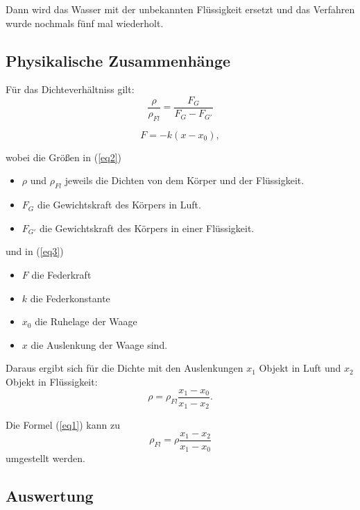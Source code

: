 \documentclass[11pt,a4paper]{article}
\begin{document}
Dann wird das Wasser mit der unbekannten Flüssigkeit ersetzt und das Verfahren wurde nochmals fünf mal wiederholt.

\subsection{Physikalische Zusammenh\"ange}

F\"ur das Dichteverh\"altniss gilt:\\

\begin{equation}
\frac{\rho}{\rho_{Fl}} = \frac{F_G}{F_G - F_{G'}}\label{eq2}
\end{equation}

\begin{equation}
F = -k(x-x_0)\mathrm{,}\label{eq3}
\end{equation}

wobei die Gr\"o\ss en in (\ref{eq2})
\begin{itemize}
  \item $\rho$ und $\rho_{Fl}$ jeweils die Dichten von dem K\"orper und der Fl\"ussigkeit.
  \item $F_G$ die Gewichtskraft des K\"orpers in Luft.
  \item $F_{G'}$ die Gewichtskraft des K\"orpers in einer Fl\"ussigkeit.
\end{itemize}

und in (\ref{eq3})
\begin{itemize}
  \item $F$ die Federkraft
  \item $k$ die Federkonstante
  \item $x_0$ die Ruhelage der Waage
  \item $x$ die Auslenkung der Waage sind.
\end{itemize}

Daraus ergibt sich f\"ur die Dichte mit den Auslenkungen $x_1$ Objekt in Luft und $x_2$ Objekt in Fl\"ussigkeit:
\begin{equation}
\rho=\rho_{Fl}\frac{x_1-x_0}{x_1-x_2}.\label{eq1}
\end{equation}

 Die Formel (\ref{eq1}) kann zu
\begin{equation}
\rho_{Fl}=\rho\frac{x_1-x_2}{x_1-x_0}\label{eq4}
\end{equation}
umgestellt werden.


\subsection{Auswertung}
\end{document}
